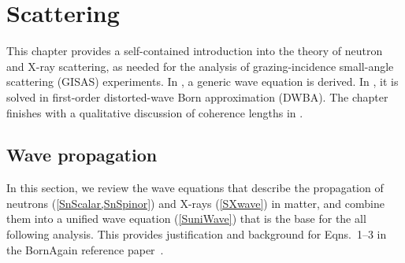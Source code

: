 
\def\Do{\overset{o}{D}}
\def\Go{\overset{o}{G}}
\def\TD{\TENS{D}}
\def\Td{\TENS{\delta}}
\def\TG{\TENS{G}}
\def\TU{\TENS{U}}
\def\TV{\TENS{V}}
\def\TL{\TENS{\Lambda}}
\def\TDo{\TENS{\overset{o}{D}}}
\def\TGo{\TENS{\overset{o}{G}}}
\def\vGo{\v{\overset{o}{G}}\vphantom{\v{G}}}
\def\Psio{\v{\overset{o}{\Psi}}\vphantom{\Psi}}
\def\ue{\v{\hat u}}

\def\pfo{\overset{o}{\psi}_\sf}
\def\pfoc{\overset{o}{\psi}\vphantom{\psi}^*_\sf}

\chapter{Scattering}\label{SSca}%
%
%

This chapter provides a self-contained introduction
into the theory of neutron and X-ray scattering,
as needed for the analysis of grazing-incidence small-angle scattering (GISAS) experiments.
%
%
%
In ,
a generic wave equation is derived.
In ,
it is solved in first-order distorted-wave Born approximation (DWBA).
%
%
The chapter finishes with a qualitative discussion
of coherence lengths in .


\section{Wave propagation}\label{Swave}
%

In this section, we review the wave equations that describe the propagation
of neutrons (\cref{SnScalar,SnSpinor}) and X-rays (\cref{SXwave}) in matter,
and combine them into a unified wave equation (\cref{SuniWave})
that is the base for the all following analysis.
This provides justification and background
for Eqns.~1--3 in the BornAgain reference paper~\cite{PoVB20}.

